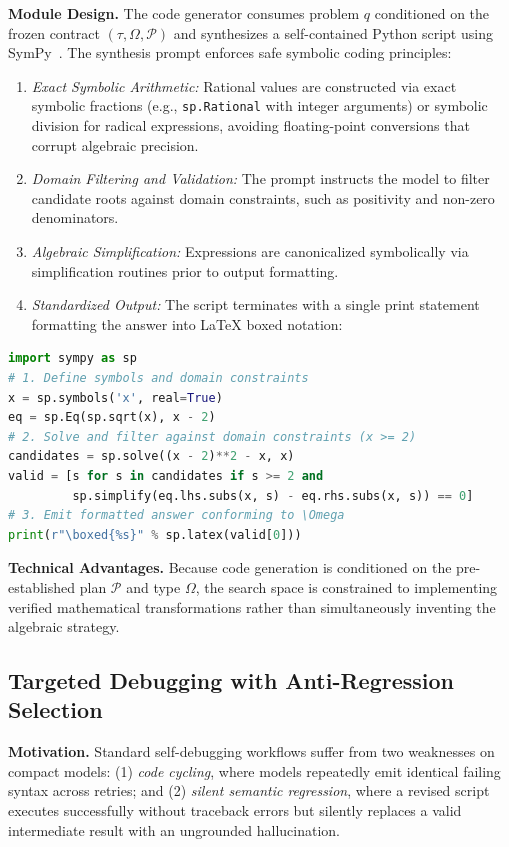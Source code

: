 \documentclass[runningheads]{llncs}
\begin{document}
\textbf{Module Design.} The code generator consumes problem $q$ conditioned on the frozen contract $(\tau, \Omega, \mathcal{P})$ and synthesizes a self-contained Python script using SymPy~\cite{meurer2017sympy}. The synthesis prompt enforces safe symbolic coding principles:
\begin{enumerate}
    \item \textit{Exact Symbolic Arithmetic:} Rational values are constructed via exact symbolic fractions (e.g., \texttt{sp.Rational} with integer arguments) or symbolic division for radical expressions, avoiding floating-point conversions that corrupt algebraic precision.
    \item \textit{Domain Filtering and Validation:} The prompt instructs the model to filter candidate roots against domain constraints, such as positivity and non-zero denominators.
    \item \textit{Algebraic Simplification:} Expressions are canonicalized symbolically via simplification routines prior to output formatting.
    \item \textit{Standardized Output:} The script terminates with a single print statement formatting the answer into \LaTeX{} boxed notation:
\end{enumerate}
\begin{lstlisting}[style=promptstyle,language=Python]
import sympy as sp
# 1. Define symbols and domain constraints
x = sp.symbols('x', real=True)
eq = sp.Eq(sp.sqrt(x), x - 2)
# 2. Solve and filter against domain constraints (x >= 2)
candidates = sp.solve((x - 2)**2 - x, x)
valid = [s for s in candidates if s >= 2 and
         sp.simplify(eq.lhs.subs(x, s) - eq.rhs.subs(x, s)) == 0]
# 3. Emit formatted answer conforming to \Omega
print(r"\boxed{%s}" % sp.latex(valid[0]))
\end{lstlisting}

\textbf{Technical Advantages.} Because code generation is conditioned on the pre-established plan $\mathcal{P}$ and type $\Omega$, the search space is constrained to implementing verified mathematical transformations rather than simultaneously inventing the algebraic strategy.

\subsection{Targeted Debugging with Anti-Regression Selection}
\label{sec:debugging}

\textbf{Motivation.} Standard self-debugging workflows suffer from two weaknesses on compact models: (1) \textit{code cycling}, where models repeatedly emit identical failing syntax across retries; and (2) \textit{silent semantic regression}, where a revised script executes successfully without traceback errors but silently replaces a valid intermediate result with an ungrounded hallucination.
\end{document}

